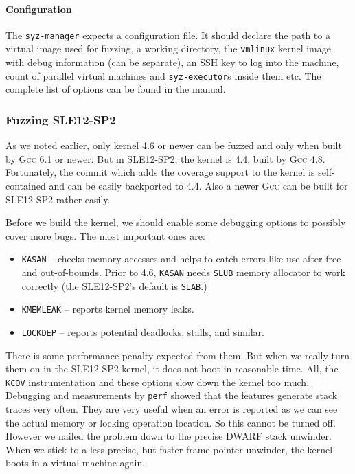 \documentclass[10pt]{llncs}
\newcommand{\gcc}{\textsc{Gcc}\xspace}
\begin{document}
\paragraph{Configuration} The \texttt{syz-manager} expects a configuration
file. It should declare the path to a virtual image used for fuzzing, a
working directory, the \texttt{vmlinux} kernel image with debug information
(can be separate), an SSH key to log into the machine, count of parallel
virtual machines and \texttt{syz-executor}s inside them etc. The complete list
of options can be found in the manual.

\subsubsection{Fuzzing SLE12-SP2}
As we noted earlier, only kernel 4.6 or newer can be fuzzed and only when
built by \gcc 6.1 or newer. But in SLE12-SP2, the kernel is 4.4, built by \gcc
4.8.  Fortunately, the commit which adds the coverage support to the kernel is
self-contained and can be easily backported to 4.4. Also a newer \gcc can be
built for SLE12-SP2 rather easily.

Before we build the kernel, we should enable some debugging options to
possibly cover more bugs. The most important ones are:
\begin{itemize}
  \item \texttt{KASAN} -- checks memory accesses and helps to catch
  errors like use-after-free and out-of-bounds. Prior to 4.6, \texttt{KASAN}
  needs \texttt{SLUB} memory allocator to work correctly (the SLE12-SP2's
  default is \texttt{SLAB}.)
  \item \texttt{KMEMLEAK} -- reports kernel memory leaks.
  \item \texttt{LOCKDEP} -- reports potential deadlocks, stalls, and similar.
\end{itemize}
There is some performance penalty expected from them. But when we really turn
them on in the SLE12-SP2 kernel, it does not boot in reasonable time.  All,
the \texttt{KCOV} instrumentation and these options slow down the kernel too
much.  Debugging and measurements by \texttt{perf} showed that the features
generate stack traces very often. They are very useful when an error is
reported as we can see the actual memory or locking operation location. So
this cannot be turned off. However we nailed the problem down to the precise
DWARF stack unwinder. When we stick to a less precise, but faster frame
pointer unwinder, the kernel boots in a virtual machine again.
\end{document}
